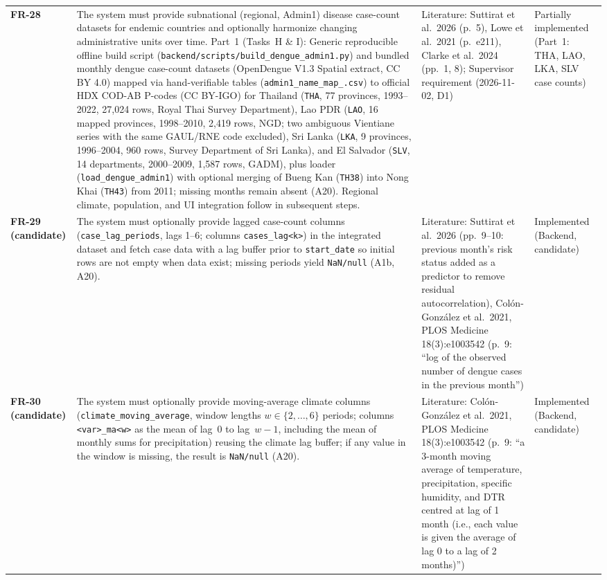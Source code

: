 \documentclass[11pt,a4paper]{article}
\begin{document}
\begin{longtable}{@{}>{\bfseries}p{1.6cm} L{7.4cm} L{3.6cm} L{2.4cm}@{}}
FR-28 & The system must provide subnational (regional, Admin1) disease case-count datasets for endemic countries and optionally harmonize changing administrative units over time. Part~1 (Tasks~H \& I): Generic reproducible offline build script (\texttt{backend/scripts/build\_dengue\_admin1.py}) and bundled monthly dengue case-count datasets (OpenDengue V1.3 Spatial extract, CC BY 4.0) mapped via hand-verifiable tables (\texttt{admin1\_name\_map\_<ISO3>.csv}) to official HDX COD-AB P-codes (CC BY-IGO) for Thailand (\texttt{THA}, 77 provinces, 1993--2022, 27,024 rows, Royal Thai Survey Department), Lao PDR (\texttt{LAO}, 16 mapped provinces, 1998--2010, 2,419 rows, NGD; two ambiguous Vientiane series with the same GAUL/RNE code excluded), Sri Lanka (\texttt{LKA}, 9 provinces, 1996--2004, 960 rows, Survey Department of Sri Lanka), and El Salvador (\texttt{SLV}, 14 departments, 2000--2009, 1,587 rows, GADM), plus loader (\texttt{load\_dengue\_admin1}) with optional merging of Bueng Kan (\texttt{TH38}) into Nong Khai (\texttt{TH43}) from 2011; missing months remain absent (A20). Regional climate, population, and UI integration follow in subsequent steps. & Literature: Suttirat et al.\ 2026 (p.~5), Lowe et al.\ 2021 (p.~e211), Clarke et al.\ 2024 (pp.~1, 8); Supervisor requirement (2026-11-02, D1) & Partially implemented (Part~1: THA, LAO, LKA, SLV case counts) \\
FR-29 (candidate) & The system must optionally provide lagged case-count columns (\texttt{case\_lag\_periods}, lags 1--6; columns \texttt{cases\_lag<k>}) in the integrated dataset and fetch case data with a lag buffer prior to \texttt{start\_date} so initial rows are not empty when data exist; missing periods yield \texttt{NaN/null} (A1b, A20). & Literature: Suttirat et al.\ 2026 (pp.~9--10: previous month's risk status added as a predictor to remove residual autocorrelation), Col\'on-Gonz\'alez et al.\ 2021, PLOS Medicine 18(3):e1003542 (p.~9: ``log of the observed number of dengue cases in the previous month'') & Implemented (Backend, candidate) \\
FR-30 (candidate) & The system must optionally provide moving-average climate columns (\texttt{climate\_moving\_average}, window lengths $w \in \{2,\dots,6\}$ periods; columns \texttt{<var>\_ma<w>} as the mean of lag~0 to lag~$w-1$, including the mean of monthly sums for precipitation) reusing the climate lag buffer; if any value in the window is missing, the result is \texttt{NaN/null} (A20). & Literature: Col\'on-Gonz\'alez et al.\ 2021, PLOS Medicine 18(3):e1003542 (p.~9: ``a 3-month moving average of temperature, precipitation, specific humidity, and DTR centred at lag of 1 month (i.e., each value is given the average of lag 0 to a lag of 2 months)'') & Implemented (Backend, candidate) \\
\bottomrule
\end{longtable}
\end{document}
